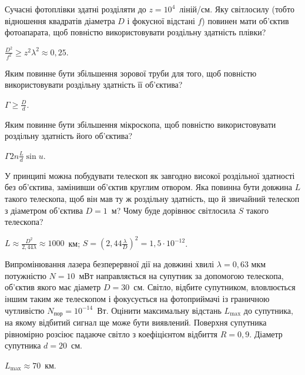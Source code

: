 \begin{problem}%
    Сучасні фотоплівки здатні розділяти до $ z = 10^4 $~ліній/см. Яку світлосилу (тобто відношення квадратів діаметра $ D $ і фокусної відстані $ f $) повинен мати об'єктив фотоапарата, щоб повністю використовувати роздільну здатність плівки?
    \begin{solution}
        $\frac{D^2}{f^2} \ge z^2\lambda^2 \approx 0,25$.
    \end{solution}
\end{problem}


\begin{problem}%
    Яким повинне бути збільшення зорової труби для того, щоб повністю
    використовувати роздільну здатність її об'єктива?
    \begin{solution}
        $\Gamma \ge \frac{D}{d}$.
    \end{solution}
\end{problem}


\begin{problem}%
    Яким повинне бути збільшення мікроскопа, щоб повністю використовувати роздільну здатність його об'єктива?
    \begin{solution}
        $\Gamma 2n  \frac{L}{d}\sin u$.
    \end{solution}
\end{problem}


\begin{problem}%
    У принципі можна побудувати телескоп як завгодно високої роздільної здатності без об'єктива, замінивши об'єктив круглим отвором. Яка повинна бути довжина $ L $ такого телескопа, щоб він мав ту ж роздільну здатність, що й звичайний телескоп з діаметром об'єктива $ D = 1 $~м? Чому буде дорівнює світлосила $ S $ такого телескопа?
    \begin{solution}
        $L \approx \frac{D^2}{2,44 \lambda} \approx 1000$~км; $ S = \left( 2,44\frac{\lambda}{D} \right)^2 = 1,5\cdot10^{-12}$.
    \end{solution}
\end{problem}


\begin{problem}%
    Випромінювання лазера безперервної дії на довжині хвилі $ \lambda = 0,63 $ мкм потужністю $ N = 10 $~мВт направляється на супутник за допомогою телескопа, об'єктив якого має діаметр $ D = 30 $~см. Світло, відбите супутником, вловлюється іншим таким же телескопом і фокусується на фотоприймачі із граничною чутливістю $ N_\text{пор} = 10^{-14} $~Вт. Оцінити максимальну відстань $ L_{\max} $ до супутника, на якому відбитий сигнал ще може бути виявлений. Поверхня супутника рівномірно розсіює падаюче світло з коефіцієнтом відбиття $ R = 0,9 $. Діаметр супутника $ d = 20 $~см.
    \begin{solution}
        $L_{\max} \approx 70$~км.
    \end{solution}
\end{problem}



